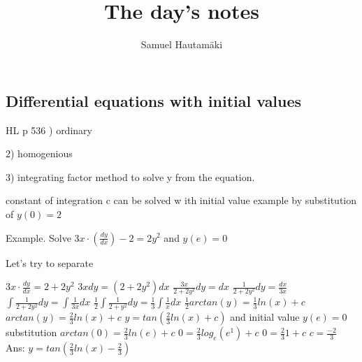 \documentclass{article}
\title{The day's notes}
\author{Samuel Hautamäki}
\begin{document}
\subsection{Differential equations with initial values}
HL p 536
) ordinary

2) homogenious

3) integrating factor method to solve y from the equation.

constant of integration c can be solved w ith initial value example by substitution of $y(0)=2$

Example. Solve $3x\cdot(\frac{dy}{dx})-2=2y^2$ and $y(e)=0$

Let's try to separate

$3x\cdot \frac{dy}{dx}=2+2y^2$ 
$3x dy=(2+2y^2)dx$
$\frac{3x}{2+2y^2}dy=dx$
$\frac{1}{2+2y^2}dy=\frac{dx}{3x}$
$\int\frac{1}{2+2y^2}dy=\int\frac{1}{3x}dx$
$\frac{1}{2}\int\frac{1}{2+y^2}dy=\frac{1}{3}\int\frac{1}{x}dx$
$\frac{1}{2}arctan(y)=\frac{1}{3}ln(x)+c$
$arctan(y)=\frac{2}{3}ln(x)+c$
$y=tan(\frac{2}{3}ln(x)+c)$ and initial value $y(e)=0$
substitution $arctan(0)=\frac{2}{3}ln(e)+c$
$0=\frac{2}{3}log_e(e^1)+c$
$0=\frac{2}{3}1+c$
$c=\frac{-2}{3}$
Ans: $y=tan(\frac{2}{3}ln(x)-\frac{2}{3})$
\end{document}
